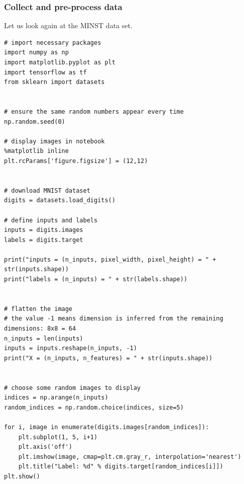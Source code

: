 \documentclass{beamer}
\begin{document}
\begin{frame}
\frametitle{Collect and pre-process data}

Let us look again at the MINST data set.













































\begin{verbatim}
# import necessary packages
import numpy as np
import matplotlib.pyplot as plt
import tensorflow as tf
from sklearn import datasets


# ensure the same random numbers appear every time
np.random.seed(0)

# display images in notebook
%matplotlib inline
plt.rcParams['figure.figsize'] = (12,12)


# download MNIST dataset
digits = datasets.load_digits()

# define inputs and labels
inputs = digits.images
labels = digits.target

print("inputs = (n_inputs, pixel_width, pixel_height) = " + str(inputs.shape))
print("labels = (n_inputs) = " + str(labels.shape))


# flatten the image
# the value -1 means dimension is inferred from the remaining dimensions: 8x8 = 64
n_inputs = len(inputs)
inputs = inputs.reshape(n_inputs, -1)
print("X = (n_inputs, n_features) = " + str(inputs.shape))


# choose some random images to display
indices = np.arange(n_inputs)
random_indices = np.random.choice(indices, size=5)

for i, image in enumerate(digits.images[random_indices]):
    plt.subplot(1, 5, i+1)
    plt.axis('off')
    plt.imshow(image, cmap=plt.cm.gray_r, interpolation='nearest')
    plt.title("Label: %d" % digits.target[random_indices[i]])
plt.show()


\end{verbatim}
\end{frame}
\end{document}
